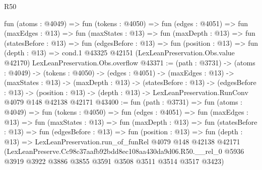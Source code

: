 \begin{lexlean}{R50}
\begin{coremodule}
  fun (atoms : @4049) =>
  fun (tokens : @4050) =>
  fun (edges : @4051) =>
  fun (maxEdges : @13) =>
  fun (maxStates : @13) =>
  fun (maxDepth : @13) =>
  fun (statesBefore : @13) =>
  fun (edgesBefore : @13) =>
  fun (position : @13) =>
  fun (depth : @13) =>
  cond.{1} @43325 @42151 (LexLeanPreservation.Obs.value @42170) LexLeanPreservation.Obs.overflow
@43371 := (path : @3731) ->
  (atoms : @4049) ->
  (tokens : @4050) ->
  (edges : @4051) ->
  (maxEdges : @13) ->
  (maxStates : @13) ->
  (maxDepth : @13) ->
  (statesBefore : @13) ->
  (edgesBefore : @13) ->
  (position : @13) -> (depth : @13) -> LexLeanPreservation.RunConv @4079 @148 @42138 @42171
@43400 := fun (path : @3731) =>
  fun (atoms : @4049) =>
  fun (tokens : @4050) =>
  fun (edges : @4051) =>
  fun (maxEdges : @13) =>
  fun (maxStates : @13) =>
  fun (maxDepth : @13) =>
  fun (statesBefore : @13) =>
  fun (edgesBefore : @13) =>
  fun (position : @13) =>
  fun (depth : @13) =>
  LexLeanPreservation.run_of_funRel
    @4079
    @148
    @42138
    @42171
    (LexLeanPreserve.Cc98c37aafb92bdd8ec108aa430da9d06.R50.__rel_0
      @5936
      @3919
      @3922
      @3886
      @3855
      @3591
      @3508
      @3511
      @3514
      @3517
      @3423)
\end{coremodule}
\end{lexlean}
